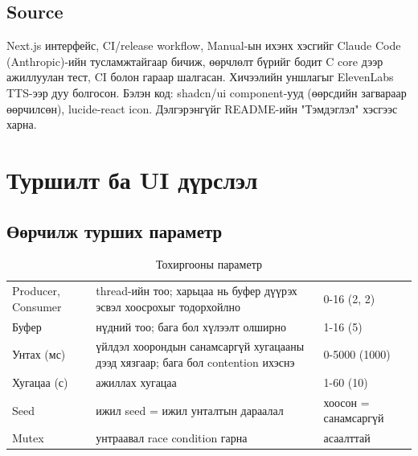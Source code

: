 \documentclass[12pt,a4paper]{article}
\begin{document}
\subsection{Source}
Next.js интерфейс, CI/release workflow, Manual-ын ихэнх хэсгийг Claude Code (Anthropic)-ийн тусламжтайгаар бичиж, өөрчлөлт бүрийг бодит C core дээр ажиллуулан тест, CI болон гараар шалгасан. Хичээлийн уншлагыг ElevenLabs TTS-ээр дуу болгосон. Бэлэн код: shadcn/ui component-ууд (өөрсдийн загвараар өөрчилсөн), lucide-react icon. Дэлгэрэнгүйг README-ийн "Тэмдэглэл" хэсгээс харна.

\section{Туршилт ба UI дүрслэл}

\subsection{Өөрчилж турших параметр}
\begin{table}[H]\centering\small
\caption{Тохиргооны параметр}\label{tab:params}
\begin{tabular}{|L{0.22\textwidth}|L{0.48\textwidth}|L{0.3\textwidth}|}\hline
{} &  &  \\\hline
Producer, Consumer & thread-ийн тоо; харьцаа нь буфер дүүрэх эсвэл хоосрохыг тодорхойлно & 0-16 (2, 2) \\\hline
Буфер & нүдний тоо; бага бол хүлээлт олширно & 1-16 (5) \\\hline
Унтах (мс) & үйлдэл хоорондын санамсаргүй хугацааны дээд хязгаар; бага бол contention ихэснэ & 0-5000 (1000) \\\hline
Хугацаа (с) & ажиллах хугацаа & 1-60 (10) \\\hline
Seed & ижил seed = ижил унталтын дараалал & хоосон = санамсаргүй \\\hline
Mutex & унтраавал race condition гарна & асаалттай \\\hline
\end{tabular}
\end{table}

\end{document}
